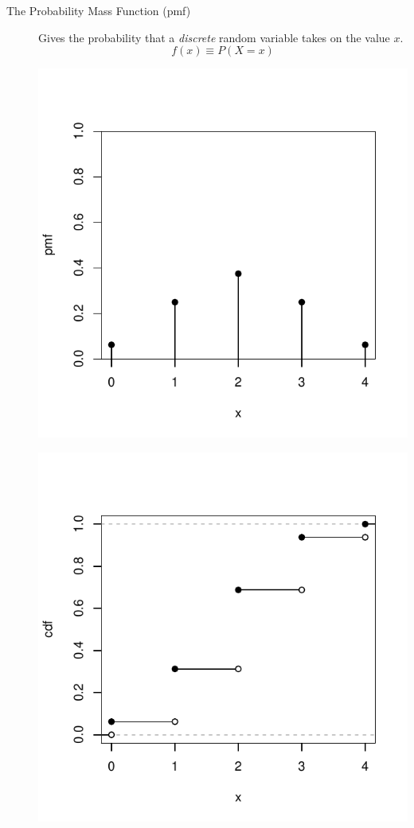 \documentclass[10pt,landscape]{article}
\begin{document}
\begin{multicols*}{3}
\begin{description}
\item[The Probability Mass Function (pmf)]
Gives the probability that a \emph{discrete} random variable takes on the value $x$.
\[ f(x) \equiv P(X=x) \]


\begin{minipage}{.45\linewidth}
            \centering
\includegraphics[width=1\linewidth, height=0.2\textheight]{figures/Binpmf.pdf}
        \end{minipage} %
   	 \begin{minipage}{.45\linewidth}
    	\centering
    	\includegraphics[width=1\linewidth, height=0.2\textheight]{figures/Bincdf.pdf}
    \end{minipage}



\end{description}
\end{multicols*}
\end{document}
